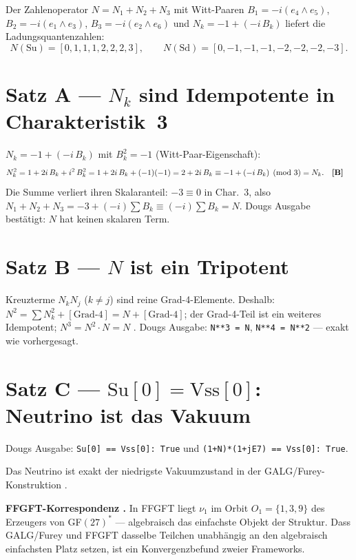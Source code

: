 Der Zahlenoperator $N = N_1+N_2+N_3$ mit Witt-Paaren
$B_1 = -i(e_4{\wedge}e_5)$, $B_2 = -i(e_1{\wedge}e_3)$, $B_3 = -i(e_2{\wedge}e_6)$ und
$N_k = -1 + (-i\,B_k)$ liefert die Ladungsquantenzahlen:
\[
  N(\mathrm{Su}) = [0,1,1,1,2,2,2,3], \qquad
  N(\mathrm{Sd}) = [0,-1,-1,-1,-2,-2,-2,-3].
\]

\section{Satz A --- $N_k$ sind Idempotente in Charakteristik~3}

$N_k = -1 + (-i\,B_k)$ mit $B_k^2 = -1$ (Witt-Paar-Eigenschaft):
\begin{align}
N_k^2 &= 1 + 2i\,B_k + i^2\,B_k^2
       = 1 + 2i\,B_k + (-1)(-1)
       = 2 + 2i\,B_k
       \equiv -1 + (-i\,B_k) \pmod{3}
       = N_k. \quad \textbf{[B]}
\end{align}
Die Summe verliert ihren Skalaranteil: $-3 \equiv 0$ in Char.~3, also
$N_1+N_2+N_3 = -3 + (-i)\sum B_k \equiv (-i)\sum B_k = N$.
Dougs Ausgabe best\"atigt: $N$ hat keinen skalaren Term.

\section{Satz B --- $N$ ist ein Tripotent}

Kreuzterme $N_k N_j$ ($k\neq j$) sind reine Grad-4-Elemente. Deshalb:
$N^2 = \sum N_k^2 + [\text{Grad-4}] = N + [\text{Grad-4}]$; der Grad-4-Teil
ist ein weiteres Idempotent; $N^3 = N^2 \cdot N = N$ \BM.
Dougs Ausgabe: \texttt{N**3 = N}, \texttt{N**4 = N**2} --- exakt wie vorhergesagt.

\section{Satz C --- $\mathrm{Su}[0] = \mathrm{Vss}[0]$: Neutrino ist das Vakuum}

Dougs Ausgabe: \texttt{Su[0] == Vss[0]: True} und \texttt{(1+N)*(1+jE7) == Vss[0]: True}.

Das Neutrino ist exakt der niedrigste Vakuumzustand in der GALG/Furey-Konstruktion \BM.

\textbf{FFGFT-Korrespondenz \BM.} In FFGFT liegt $\nu_1$ im Orbit $O_1 = \{1,3,9\}$
des Erzeugers von GF$(27)^*$ --- algebraisch das einfachste Objekt der Struktur.
Dass GALG/Furey und FFGFT dasselbe Teilchen unabh\"angig an den algebraisch einfachsten
Platz setzen, ist ein Konvergenzbefund zweier Frameworks.

